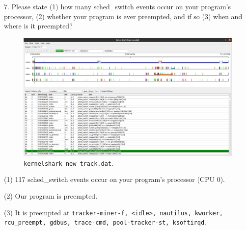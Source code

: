 \documentclass[a4paper]{article}
\begin{document}
7. Please state (1) how many sched\_switch events occur on your program's processor, (2) whether your program is ever preempted, and if so (3) when and where is it preempted?
\begin{figure}[H]
    \centering
    \includegraphics[width=1\textwidth]{8.png}
    \caption{\texttt{kernelshark new\_track.dat}.}
\end{figure}
(1) 117 sched\_switch events occur on your program's processor (CPU 0).

(2) Our program is preempted.

(3) It is preempted at \texttt{tracker-miner-f, <idle>, nautilus, kworker, rcu\_preempt, gdbus, trace-cmd, pool-tracker-st, ksoftirqd}.
\printbibliography
\end{document}
